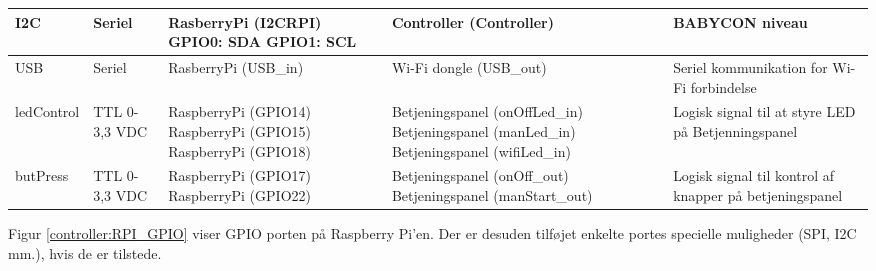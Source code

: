 \begin{center}
\begin{longtable}{|p{}|p{}|p{}|p{}|p{3cm}|}
I2C			
&Seriel		
&RasberryPi \newline (I2CRPI) \newline	
	GPIO0: SDA \newline	
	GPIO1: SCL \newline	
&Controller \newline (Controller) 			
&BABYCON niveau
\\\hline

USB		
&Seriel				
&RasberryPi \newline (USB\_in) 			
&Wi-Fi dongle \newline (USB\_out) \newline	
&Seriel kommunikation for Wi-Fi forbindelse
\\\hline

ledControl
&TTL 0-3,3 VDC		
&RaspberryPi \newline (GPIO14) \newline
 RaspberryPi \newline (GPIO15) \newline
 RaspberryPi \newline (GPIO18)
&Betjeningspanel \newline (onOffLed\_in) \newline
 Betjeningspanel \newline (manLed\_in) \newline
 Betjeningspanel \newline (wifiLed\_in)
&Logisk signal til at styre LED på Betjenningspanel
\\\hline

butPress
&TTL 0-3,3 VDC		
&RaspberryPi \newline (GPIO17) \newline
 RaspberryPi \newline (GPIO22)
&Betjeningspanel \newline (onOff\_out) \newline
 Betjeningspanel \newline (manStart\_out)
&Logisk signal til kontrol af knapper på betjeningspanel
\\\hline

\end{longtable}
\end{center}

Figur \ref{controller:RPI_GPIO} viser GPIO porten på Raspberry Pi'en. Der er desuden tilføjet enkelte portes specielle muligheder (SPI, I2C mm.), hvis de er tilstede. 

